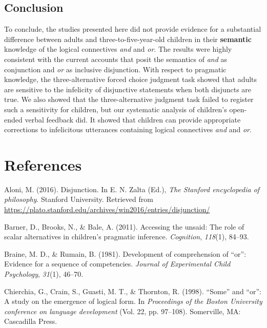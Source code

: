 \documentclass[floatsintext,man]{apa6}
\theoremstyle{definition}
\theoremstyle{definition}
\theoremstyle{definition}
\theoremstyle{remark}
\begin{document}
\subsection{Conclusion}\label{conclusion}

To conclude, the studies presented here did not provide evidence for a
substantial difference between adults and three-to-five-year-old
children in their \textbf{semantic} knowledge of the logical connectives
\emph{and} and \emph{or}. The results were highly consistent with the
current accounts that posit the semantics of \emph{and} as conjunction
and \emph{or} as inclusive disjunction. With respect to pragmatic
knowledge, the three-alternative forced choice judgment task showed that
adults are sensitive to the infelicity of disjunctive statements when
both disjuncts are true. We also showed that the three-alternative
judgment task failed to register such a sensitivity for children, but
our systematic analysis of children's open-ended verbal feedback did. It
showed that children can provide appropriate corrections to infelicitous
utterances containing logical connectives \emph{and} and \emph{or}.

\newpage

\section{References}\label{references}

\setlength{\parindent}{-0.5in} \setlength{\leftskip}{0.5in}

\hypertarget{refs}{}
\hypertarget{ref-Aloni2016}{}
Aloni, M. (2016). Disjunction. In E. N. Zalta (Ed.), \emph{The Stanford
encyclopedia of philosophy}. Stanford University. Retrieved from
\url{https://plato.stanford.edu/archives/win2016/entries/disjunction/}

\hypertarget{ref-barner2011accessing}{}
Barner, D., Brooks, N., \& Bale, A. (2011). Accessing the unsaid: The
role of scalar alternatives in children's pragmatic inference.
\emph{Cognition}, \emph{118}(1), 84--93.

\hypertarget{ref-braine1981development}{}
Braine, M. D., \& Rumain, B. (1981). Development of comprehension of
``or'': Evidence for a sequence of competencies. \emph{Journal of
Experimental Child Psychology}, \emph{31}(1), 46--70.

\hypertarget{ref-chierchia1998some}{}
Chierchia, G., Crain, S., Guasti, M. T., \& Thornton, R. (1998).
``Some'' and ``or'': A study on the emergence of logical form. In
\emph{Proceedings of the Boston University conference on language
development} (Vol. 22, pp. 97--108). Somerville, MA: Cascadilla Press.
\end{document}
